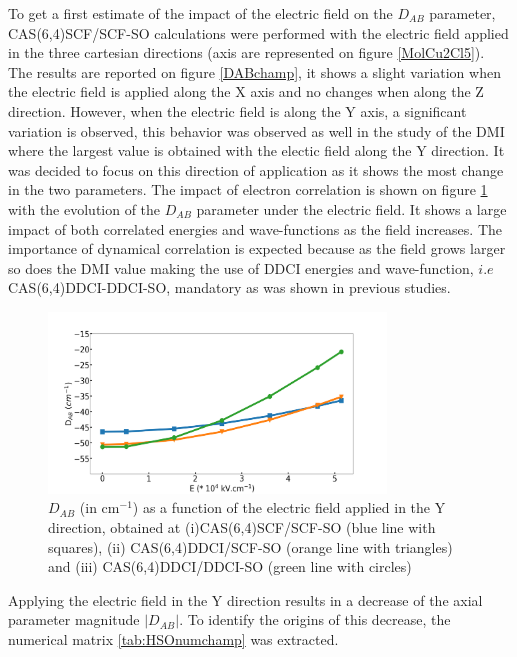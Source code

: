 \documentclass[10pt]{report}
\numberwithin{equation}{section}
\begin{document}
To get a first estimate of the impact of the electric field on the $D_{AB}$ parameter, CAS(6,4)SCF/SCF-SO calculations were performed with the electric field applied in the three cartesian directions (axis are represented on figure \ref{MolCu2Cl5}).
The results are reported on figure \ref{DABchamp}, it shows a slight variation when the electric field is applied along the X axis and no changes when along the Z direction.
However, when the electric field is along the Y axis, a significant variation is observed, this behavior was observed as well in the study of the DMI where the largest value is obtained with the electic field along the Y direction.
It was decided to focus on this direction of application as it shows the most change in the two parameters.
The impact of electron correlation is shown on figure \ref{DABcorrelation} with the evolution of the $D_{AB}$ parameter under the electric field. 
It shows a large impact of both correlated energies and wave-functions as the field increases.
The importance of dynamical correlation is expected because as the field grows larger so does the DMI value making the use of DDCI energies and wave-function, $i.e$ CAS(6,4)DDCI-DDCI-SO, mandatory as was shown in previous studies.

\begin{figure}[!h]
    \centering
    \includegraphics[width=0.8\textwidth]{Images/DABcorrelation.png}
    \caption{$D_{AB}$ (in cm$^{-1}$) as a function of the electric field applied in the Y direction, obtained at (i)CAS(6,4)SCF/SCF-SO (blue line with squares), (ii) CAS(6,4)DDCI/SCF-SO (orange line with triangles) and (iii) CAS(6,4)DDCI/DDCI-SO (green line with circles)}
    \label{DABcorrelation}
\end{figure}

Applying the electric field in the Y direction results in a decrease of the axial parameter magnitude $|D_{AB}|$.
To identify the origins of this decrease, the numerical matrix \ref{tab:HSOnumchamp} was extracted.
\end{document}
